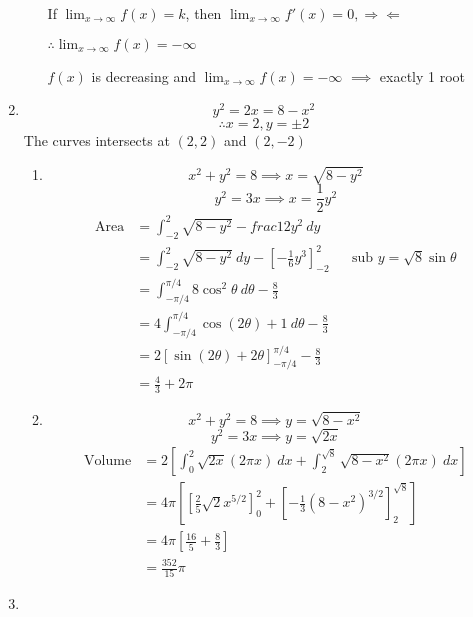 \documentclass[12pt]{article}
\theoremstyle{definition}
\begin{document}
\begin{enumerate}
\begin{enumerate}[label=(\alph*)]
                If $\lim_{x\to \infty}f(x)=k$, then $\lim_{x\to \infty}f'(x)=0,\Rightarrow\!\Leftarrow$
                
                $\therefore \lim_{x\to \infty}f(x)=-\infty$
                
                $f(x)$ is decreasing and $\lim_{x\to \infty}f(x)=-\infty$ $\implies$ exactly 1 root
        \end{enumerate}
  \item \[y^2 = 2x = 8 - x^2\]
        \[\therefore x=2,y=\pm 2\]
        The curves intersects at $(2,2)$ and $(2,-2)$
        \begin{enumerate}[label=(\roman*)]
          \item \[x^2+y^2=8 \implies x=\sqrt{8-y^2}\]
                \[y^2 = 3x \implies x=\frac{1}{2}y^2\]
                \begin{align*}
                  \text{Area} &= \int_{-2}^2 \sqrt{8-y^2}-frac{1}{2}y^2\ dy \\
                    &= \int_{-2}^2 \sqrt{8-y^2}\ dy - \left[-\frac{1}{6}y^3\right]_{-2}^2 && \text{sub $y=\sqrt{8}\sin\theta$} \\
                    &= \int_{-\pi/4}^{\pi/4}8\cos^2\theta\ d\theta - \frac{8}{3} \\
                    &= 4\int_{-\pi/4}^{\pi/4} \cos(2\theta)+1\ d\theta - \frac{8}{3} \\
                    &= 2[\sin(2\theta)+2\theta]_{-\pi/4}^{\pi/4} - \frac{8}{3} \\
                    &= \frac{4}{3} + 2\pi 
                \end{align*}
          \item \[x^2+y^2=8 \implies y=\sqrt{8-x^2}\]
                \[y^2 = 3x \implies y=\sqrt{2x}\]
                \begin{align*}
                  \text{Volume} &= 2\left[\int_0^2 \sqrt{2x}(2\pi x)\ dx + \int_2^{\sqrt{8}}\sqrt{8-x^2}(2\pi x)\ dx \right] \\
                    &= 4\pi\left[\left[\frac{2}{5}\sqrt{2}x^{5/2}\right]_0^2 + \left[-\frac{1}{3}(8-x^2)^{3/2} \right]_2^{\sqrt{8}} \right] \\
                    &= 4\pi\left[\frac{16}{5} + \frac{8}{3}\right] \\
                    &= \frac{352}{15}\pi
                \end{align*}
        \end{enumerate}
   \item \begin{enumerate}[label=(\roman*)]

\end{enumerate}
\end{enumerate}
\end{document}
